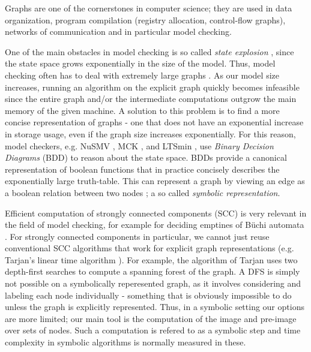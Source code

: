 \documentclass[../master/master.tex]{subfiles}
\begin{document}
Graphs are one of the cornerstones in computer science; they are used in data organization,  program compilation (registry allocation, control-flow graphs), networks of communication and in particular model checking.

One of the main obstacles in model checking is so called \textit{state explosion} \cite{clarke_henzinger_veith_bloem_2018}, since the state space grows exponentially in the size of the model. Thus, model checking often has to deal with extremely large graphs \cite{pelanek_2004}. As our model size increases, running an algorithm on the explicit graph quickly becomes infeasible since the entire graph and/or the intermediate computations outgrow the main memory of the given machine. A solution to this problem is to find a more concise representation of graphs - one that does not have an exponential increase in storage usage, even if the graph size increases exponentially. For this reason, model checkers, e.g. NuSMV \cite{NUSMV, NUSMV2}, MCK \cite{MCK}, and LTSmin \cite{LTSmin}, use \textit{Binary Decision Diagrams} (BDD) \cite{bryant_1986} to reason about the state space. BDDs provide a canonical representation of boolean functions that in practice concisely describes the exponentially large truth-table. This can represent a graph by viewing an edge as a boolean relation between two nodes \cite{bryant_1992}; a so called \textit{symbolic representation}.

Efficient computation of strongly connected components (SCC) is very relevant in the field of model checking, for example for deciding emptines of Büchi automata \cite{spin}.  For strongly connected components in particular, we cannot just reuse conventional SCC algorithms that work for explicit graph representations (e.g. Tarjan's linear time algorithm \cite{tarjan_1971}). For example, the algorithm of Tarjan \cite{tarjan_1971} uses two depth-first searches to compute a spanning forest of the graph. A DFS is simply not possible on a symbolically reperesented graph, as it involves considering and labeling each node individually - something that is obviously impossible to do unless the graph is explicitly represented. Thus, in a symbolic setting our options are more limited; our main tool is the computation of the image and pre-image over sets of nodes. Such a computation is refered to as a symbolic step and time complexity in symbolic algorithms is normally measured in these.
\end{document}
